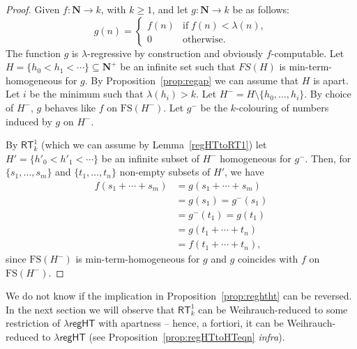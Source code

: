 \documentclass[a4paper,11pt]{article}
\newcommand\Nat{\mathbf{N}}
\newcommand\RCA{\mathsf{RCA}}
\newcommand\ACA{\mathsf{ACA}}
\newcommand\HT{\mathsf{HT}}
\newcommand\RT{\mathsf{RT}}
\newcommand\regHT{\mathsf{regHT}}
\newcommand\FS{\mathrm{FS}}
\newcommand\ap{\mathsf{ap}}
\begin{document}
\begin{proof}

Given $f: \Nat \to k$, with $k\geq 1$, and let $g:\Nat \to k$ be as follows: 
$$
    g(n) =
    \begin{cases}
      f(n) & \mathrm{if} \; f(n) < \lambda(n), \\
      0        & \text{otherwise.}
    \end{cases}
$$
The function $g$ is $\lambda$-regressive by construction and obviously $f$-computable. Let $H=\{h_0 < h_1 <  \cdots\}\subseteq\Nat^+$ 
be an infinite set such that $FS(H)$ is
min-term-homogeneous for $g$. By Proposition~\ref{prop:regap} we can assume that $H$ is apart. 
Let $i$ be the minimum such that $\lambda(h_i) > k$. 
Let $H^{-} = H \setminus \{h_0, \dots, h_i\}$. By choice of $H^-$, $g$ behaves like $f$ on 
$\FS(H^-)$. Let $g^-$ be the $k$-colouring of numbers induced by $g$ on $H^-$.

By $\RT^1_k$ (which we can assume by Lemma~\ref{regHTtoRT1}) let $H'= \{h'_0 <  h'_1 < \cdots\}$ be an infinite subset of $H^-$ homogeneous for $g^-$. Then, 
for $\{s_1, \dots, s_m\}$ and $\{t_1, \dots, t_n\}$ non-empty subsets of $H'$, we have
\begin{equation*}
\begin{split}
f(s_1+\cdots+s_m) & = g(s_1 + \cdots + s_m)\\
 & = g(s_1)  = g^-(s_1)\\
 & = g^-(t_1)  = g(t_1) \\ 
 & = g(t_1+\cdots + t_n) \\
 & = f(t_1+\cdots + t_n),
\end{split}
\end{equation*}
since $\FS(H^-)$ is min-term-homogeneous for $g$ and $g$ coincides with $f$ on $\FS(H^-)$. 
\end{proof}

We do not know if the implication in Proposition~\ref{prop:reghtht} can be reversed. In the next section we will observe that $\RT^1_k$ can be Weihrauch-reduced to some restriction of $\lambda\regHT$ with apartness -- hence, a fortiori, it can be Weihrauch-reduced to $\lambda\regHT$ (see Proposition~\ref{prop:regHTtoHTeqn} {\em infra}).
\end{document}
